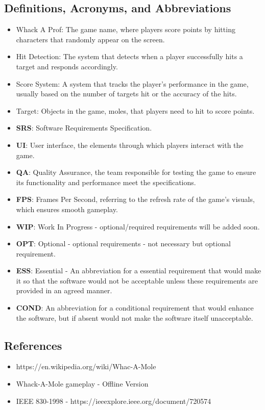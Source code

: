 \documentclass{article}
\begin{document}
\subsection{Definitions, Acronyms, and Abbreviations}
\begin{itemize}
    \item Whack A Prof: The game name, where players score points by hitting characters that randomly appear on the screen.
    \item Hit Detection: The system that detects when a player successfully hits a target and responds accordingly.
    \item Score System: A system that tracks the player's performance in the game, usually based on the number of targets hit or the accuracy of the hits.
    \item Target: Objects in the game, moles, that players need to hit to score points.
    \item \textbf{SRS}: Software Requirements Specification.
    \item \textbf{UI}: User interface, the elements through which players interact with the game.
    \item \textbf{QA}: Quality Assurance, the team responsible for testing the game to ensure its functionality and performance meet the specifications.
    \item \textbf{FPS}: Frames Per Second, referring to the refresh rate of the game's visuals, which ensures smooth gameplay.
    \item \textbf{WIP}: Work In Progress - optional/required requirements will be added soon.
    \item \textbf{OPT}: Optional - optional requirements -  not necessary but optional requirement.
    \item \textbf{ESS}: Essential - An abbreviation for a essential requirement that would make it so that the software would not be acceptable unless these requirements are provided in an agreed manner.
    \item \textbf{COND}: An abbreviation for a conditional requirement that would enhance the software, but if absent would not make the software itself unacceptable.

\end{itemize}

\subsection{References}
\begin{itemize}
    \item https://en.wikipedia.org/wiki/Whac-A-Mole
    \item Whack-A-Mole gameplay - Offline Version
    \item IEEE 830-1998 - https://ieeexplore.ieee.org/document/720574 
\end{itemize}
\end{document}
